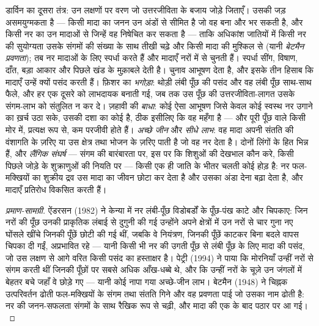 \begin{definition}[लैंगिक वरण]\label{def:b3:behavioural-ecology:sexual-selection}
डार्विन का दूसरा तंत्र: उन लक्षणों पर वरण जो उत्तरजीविता के बजाय जोड़े
जिताएँ। उसकी जड़ असमयुग्मकता है --- किसी मादा का जनन उन अंडों से सीमित है
जो वह बना और भर सकती है, और किसी नर का उन मादाओं से जिन्हें वह निषेचित
कर सकता है --- ताकि अधिकांश जातियों में किसी नर की सुयोग्यता उसके संगमों की
संख्या के साथ तीखी चढ़े और किसी मादा की मुश्किल से (यानी \emph{बेटमैन
प्रवणता}); तब नर मादाओं के लिए स्पर्धा करते हैं और मादाएँ नरों में से
चुनती हैं। स्पर्धा सींग, विषाण, दाँत, बड़ा आकार और पिछले खंड के
मुक़ाबले देती है। चुनाव आभूषण देता है, और इसके तीन हिसाब कि मादाएँ
उन्हें क्यों पसंद करती हैं। फ़िशर का \emph{भगोड़ा}: थोड़ी लंबी पूँछ की
पसंद और वह लंबी पूँछ साथ-साथ फैले, और हर एक दूसरे को लाभदायक बनाती गई,
जब तक उस पूँछ की उत्तरजीविता-लागत उसके संगम-लाभ को संतुलित न कर दे।
ज़हावी की \emph{बाधा}: कोई ऐसा आभूषण जिसे केवल कोई स्वस्थ नर उगाने का
ख़र्च उठा सके, उसकी दशा का कोई  है, ठीक इसीलिए कि वह महँगा
है --- और पूरी पूँछ वाले किसी मोर में, प्रत्यक्ष रूप से, कम परजीवी होते
हैं। \emph{अच्छे जीन} और \emph{सीधे लाभ}: वह मादा अपनी संतति की
वंशागति के ज़रिए या उस क्षेत्र तथा भोजन के ज़रिए पाती है जो वह नर देता
है। दोनों लिंगों के हित भिन्न हैं, और \emph{लैंगिक संघर्ष} --- संगम की
बारंबारता पर, इस पर कि शिशुओं की देखभाल कौन करे, किसी पिछले जोड़े के
शुक्राणुओं की नियति पर --- किसी एक ही जाति के भीतर चलती कोई होड़ है: नर
फल-मक्खियों का शुक्रीय द्रव उस मादा का जीवन छोटा कर देता है और उसका
अंडा देना बढ़ा देता है, और मादाएँ प्रतिरोध विकसित करती हैं।
\end{definition}

\begin{proof}[प्रमाण-सामग्री]
ऐंडरसन (1982) ने केन्या में नर लंबी-पूँछ विडोबर्डों के पूँछ-पंख काटे
और चिपकाए: जिन नरों की पूँछ उनकी प्राकृतिक लंबाई से दुगुनी की गई
उन्होंने अपने क्षेत्रों में उन नरों से चार गुना नए घोंसले खींचे जिनकी
पूँछें छोटी की गई थीं, जबकि वे नियंत्रण, जिनकी पूँछें काटकर बिना बदले
वापस चिपका दी गईं, अप्रभावित रहे --- यानी किसी भी नर की उगती पूँछ से
लंबी पूँछ के लिए मादा की पसंद, जो उस लक्षण से आगे वरित किसी पसंद का
हस्ताक्षर है। पेट्री (1994) ने पाया कि मोरनियाँ उन्हीं नरों से संगम
करती थीं जिनकी पूँछों पर सबसे अधिक आँख-धब्बे थे, और कि उन्हीं नरों के
चूज़े उन जंगलों में बेहतर बचे जहाँ वे छोड़े गए --- यानी कोई नापा गया
अच्छे-जीन लाभ। बेटमैन (1948) ने चिह्नक उत्परिवर्तन ढोती फल-मक्खियों के
संगम तथा संतति गिने और वह प्रवणता पाई जो उसका नाम ढोती है: नर की
जनन-सफलता संगमों के साथ रैखिक रूप से चढ़ी, और मादा की एक के बाद पठार पर
आ गई।
\end{proof}

